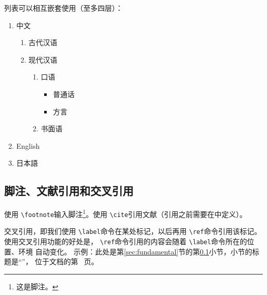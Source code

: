 \documentclass[zihao = -4, linespread = 1.5]{ctexart}
\begin{document}
列表可以相互嵌套使用（至多四层）：
\begin{enumerate}
  \item 中文
  \begin{enumerate}
    \item 古代汉语
    \item 现代汉语
    \begin{enumerate}
      \item 口语
      \begin{itemize}
        \item 普通话
        \item 方言
      \end{itemize}
      \item 书面语
    \end{enumerate}
  \end{enumerate}
  \item English
  \item 日本語
\end{enumerate}

\subsection{脚注、文献引用和交叉引用}\label{subsec:crossRef}
使用 \texttt{\textbackslash footnote}输入脚注\footnote{这是脚注。 }。使用 \texttt{\textbackslash cite}引用文献\cite{PangQingShan}（引用之前需要在中定义）。

交叉引用，即我们使用 \texttt{\textbackslash label}命令在某处标记，以后再用 \texttt{\textbackslash ref}命令引用该标记。
使用交叉引用功能的好处是， \texttt{\textbackslash ref}命令引用的内容会随着 \texttt{\textbackslash label}命令所在的位置、环境
自动变化。
示例：此处是第\ref{sec:fundamental}节的第\ref{subsec:crossRef}小节，小节的标题是“”，
位于文档的第~\pageref{subsec:crossRef} 页。%

\end{document}
